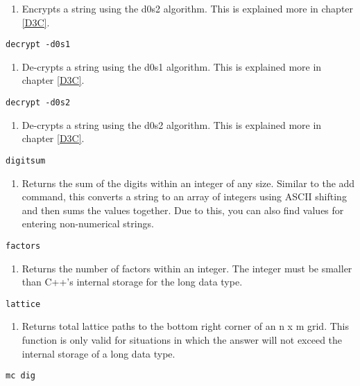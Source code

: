 \begin{enumerate}
	\item[] Encrypts a string using the d0s2 algorithm. This is explained more in chapter \ref{D3C}.
\end{enumerate}
\begin{lstlisting} 
decrypt -d0s1   
\end{lstlisting}
\begin{enumerate}
	\item[] De-crypts a string using the d0s1 algorithm. This is explained more in chapter \ref{D3C}.
\end{enumerate}
\begin{lstlisting} 
decrypt -d0s2   
\end{lstlisting}
\begin{enumerate}
	\item[] De-crypts a string using the d0s2 algorithm. This is explained more in chapter \ref{D3C}.
\end{enumerate}
\begin{lstlisting} 
digitsum 
\end{lstlisting}
\begin{enumerate}
	\item[] Returns the sum of the digits within an integer of any size. Similar to the add command, this converts a string to an array of integers using ASCII shifting and then sums the values together. Due to this, you can also find values for entering non-numerical strings.
\end{enumerate}
\begin{lstlisting} 
factors   
\end{lstlisting}
\begin{enumerate}
	\item[] Returns the number of factors within an integer. The integer must be smaller than C++'s internal storage for the long data type.
\end{enumerate}
\begin{lstlisting} 
lattice   
\end{lstlisting}
\begin{enumerate}
	\item[] Returns total lattice paths to the bottom right corner of an n x m grid. This function is only valid for situations in which the answer will not exceed the internal storage of a long data type.
\end{enumerate}
\begin{lstlisting} 
mc dig
\end{lstlisting}
